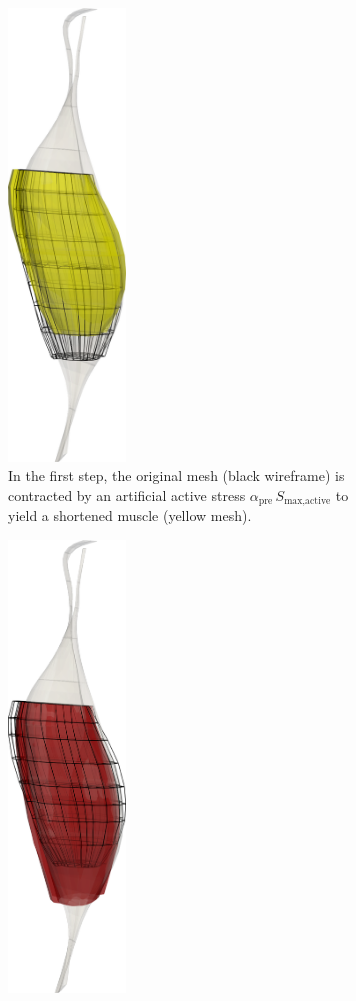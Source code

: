 \begin{figure}
  \centering%
  \hfill
  \begin{subfigure}[t]{0.48\textwidth}%
    \centering%
    \includegraphics[height=12cm]{images/results/application/neuromuscular_prestretch_1.png}%
    \caption{In the first step, the original mesh (black wireframe) is contracted by an artificial active stress $\alpha_\text{pre}\,S_\text{max,active}$ to yield a shortened muscle (yellow mesh).}%
    \label{fig:neuromuscular_prestretch_1}%
  \end{subfigure}\hfill
  \begin{subfigure}[t]{0.48\textwidth}%
    \centering%
    \includegraphics[height=12cm]{images/results/application/neuromuscular_prestretch_2.png}%

\end{subfigure}
\end{figure}
